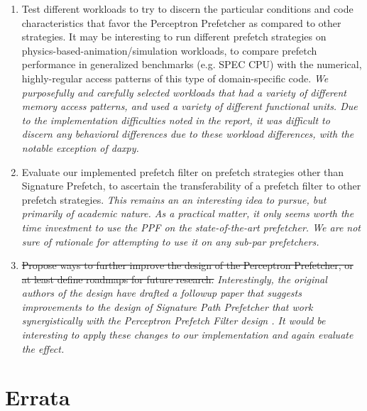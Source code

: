 \documentclass[10pt,conference]{IEEEtran}
\begin{document}
\begin{itemize}
\begin{enumerate}
      \item Test different workloads to try to discern the particular conditions and code characteristics that favor the Perceptron Prefetcher as compared to other strategies. It may be interesting to run different prefetch strategies on physics-based-animation/simulation workloads, to compare prefetch performance in generalized benchmarks (e.g. SPEC CPU) with the numerical, highly-regular access patterns of this type of domain-specific code. \textit{We purposefully and carefully selected workloads that had a variety of different memory access patterns, and used a variety of different functional units. Due to the implementation difficulties noted in the report, it was difficult to discern any behavioral differences due to these workload differences, with the notable exception of daxpy.}
      \item Evaluate our implemented prefetch filter on prefetch strategies other than Signature Prefetch, to ascertain the transferability of a prefetch filter to other prefetch strategies. \textit{This remains an  an interesting idea to pursue, but primarily of academic nature. As a practical matter, it only seems worth the time investment to use the PPF on the state-of-the-art prefetcher. We are not sure of rationale for attempting to use it on any sub-par prefetchers.}
      \item \sout{Propose ways to further improve the design of the Perceptron Prefetcher, or at least define roadmaps for future research.} \textit{Interestingly, the original authors of the design have drafted a followup paper that suggests improvements to the design of Signature Path Prefetcher that work synergistically with the Perceptron Prefetch Filter design \cite{Bhatia2019EnhancingSP}. It would be interesting to apply these changes to our implementation and again evaluate the effect.}
  \end{enumerate}
\end{itemize}

\section{Errata} \label{sec:errata}
\end{document}
